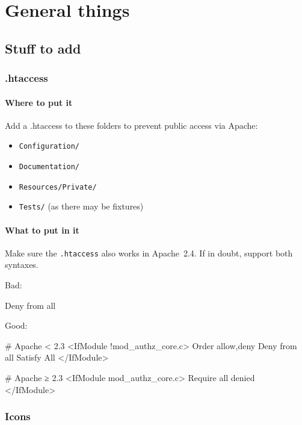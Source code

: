 \chapter{General things}

\section{Stuff to add}

\subsection{.htaccess}

\subsubsection{Where to put it}

Add a .htaccess to these folders to prevent public access via Apache:

\begin{itemize}
  \item \texttt{Configuration/}
  \item \texttt{Documentation/}
  \item \texttt{Resources/Private/}
  \item \texttt{Tests/} (as there may be fixtures)
\end{itemize}

\subsubsection{What to put in it}

Make sure the \texttt{.htaccess} also works in Apache~2.4. If in doubt, support both syntaxes.

Bad:

\begin{textcode}
Deny from all
\end{textcode}

Good:

\begin{textcode}
# Apache < 2.3
<IfModule !mod_authz_core.c>
  Order allow,deny
  Deny from all
  Satisfy All
</IfModule>

# Apache ≥ 2.3
<IfModule mod_authz_core.c>
  Require all denied
</IfModule>
\end{textcode}

\subsection{Icons}


